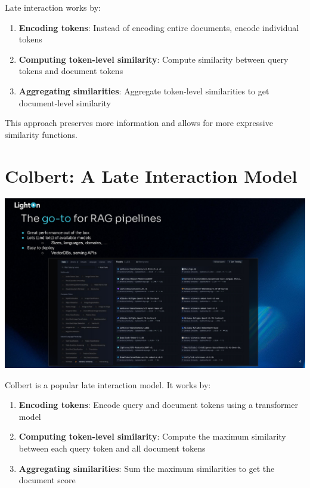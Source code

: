 \documentclass[
  letterpaper,
  oneside]{scrbook}
\providecommand{\tightlist}{%
  \setlength{\itemsep}{0pt}\setlength{\parskip}{0pt}}\usepackage{longtable,booktabs,array}
\begin{document}
Late interaction works by:

\begin{enumerate}
\def\labelenumi{\arabic{enumi}.}
\tightlist
\item
  \textbf{Encoding tokens}: Instead of encoding entire documents, encode
  individual tokens
\item
  \textbf{Computing token-level similarity}: Compute similarity between
  query tokens and document tokens
\item
  \textbf{Aggregating similarities}: Aggregate token-level similarities
  to get document-level similarity
\end{enumerate}

This approach preserves more information and allows for more expressive
similarity functions.

\section{Colbert: A Late Interaction
Model}\label{colbert-a-late-interaction-model}

\includegraphics{chapters/../p4-images/slide_4.png}

Colbert is a popular late interaction model. It works by:

\begin{enumerate}
\def\labelenumi{\arabic{enumi}.}
\tightlist
\item
  \textbf{Encoding tokens}: Encode query and document tokens using a
  transformer model
\item
  \textbf{Computing token-level similarity}: Compute the maximum
  similarity between each query token and all document tokens
\item
  \textbf{Aggregating similarities}: Sum the maximum similarities to get
  the document score
\end{enumerate}
\end{document}
